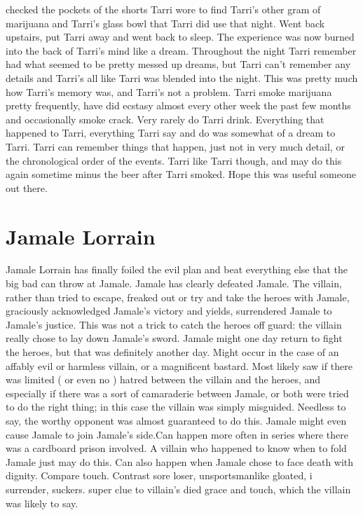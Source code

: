 \documentclass[12pt]{book}
\begin{document}
checked the pockets of the shorts Tarri wore to find Tarri's other gram of marijuana and Tarri's glass bowl that Tarri did use that night. Went back upstairs, put Tarri away and went back to sleep. The experience was now burned into the back of Tarri's mind like a dream. Throughout the night Tarri remember had what seemed to be pretty messed up dreams, but Tarri can't remember any details and Tarri's all like Tarri was blended into the night. This was pretty much how Tarri's memory was, and Tarri's not a problem. Tarri smoke marijuana pretty frequently, have did ecstasy almost every other week the past few months and occasionally smoke crack. Very rarely do Tarri drink. Everything that happened to Tarri, everything Tarri say and do was somewhat of a dream to Tarri. Tarri can remember things that happen, just not in very much detail, or the chronological order of the events. Tarri like Tarri though, and may do this again sometime minus the beer after Tarri smoked. Hope this was useful someone out there.



\chapter{Jamale Lorrain}

Jamale Lorrain has finally foiled the evil plan and beat everything else that the big bad can throw at Jamale. Jamale has clearly defeated Jamale. The villain, rather than tried to escape, freaked out or try and take the heroes with Jamale, graciously acknowledged Jamale's victory and yields, surrendered Jamale to Jamale's justice. This was not a trick to catch the heroes off guard: the villain really chose to lay down Jamale's sword. Jamale might one day return to fight the heroes, but that was definitely another day. Might occur in the case of an affably evil or harmless villain, or a magnificent bastard. Most likely saw if there was limited ( or even no ) hatred between the villain and the heroes, and especially if there was a sort of camaraderie between Jamale, or both were tried to do the right thing; in this case the villain was simply misguided. Needless to say, the worthy opponent was almost guaranteed to do this. Jamale might even cause Jamale to join Jamale's side.Can happen more often in series where there was a cardboard prison involved. A villain who happened to know when to fold Jamale just may do this. Can also happen when Jamale chose to face death with dignity. Compare touch. Contrast sore loser, unsportsmanlike gloated, i surrender, suckers. super clue to villain's died grace and touch, which the villain was likely to say.
\end{document}
